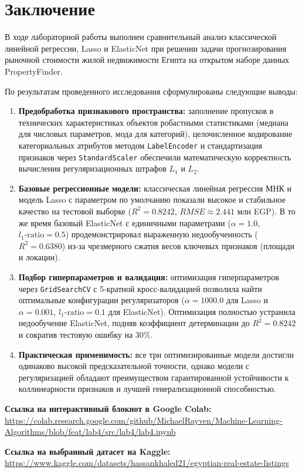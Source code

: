 \chapter*{Заключение}

В ходе лабораторной работы выполнен сравнительный анализ классической линейной регрессии, Lasso и ElasticNet при решении задачи прогнозирования рыночной стоимости жилой недвижимости Египта на открытом наборе данных PropertyFinder.

По результатам проведенного исследования сформулированы следующие выводы:
\begin{enumerate}
    \item \textbf{Предобработка признакового пространства:} заполнение пропусков в технических характеристиках объектов робастными статистиками (медиана для числовых параметров, мода для категорий), целочисленное кодирование категориальных атрибутов методом \texttt{LabelEncoder} и стандартизация признаков через \texttt{StandardScaler} обеспечили математическую корректность вычисления регуляризационных штрафов $L_1$ и $L_2$.
    \item \textbf{Базовые регрессионные модели:} классическая линейная регрессия МНК и модель Lasso с параметром по умолчанию показали высокое и стабильное качество на тестовой выборке ($R^2 = 0.8242$, $RMSE \approx 2.441$ млн EGP). В то же время базовый ElasticNet с единичными параметрами ($\alpha = 1.0$, $l_1\text{-ratio} = 0.5$) продемонстрировал выраженную недообученность ($R^2 = 0.6380$) из-за чрезмерного сжатия весов ключевых признаков (площади и локации).
    \item \textbf{Подбор гиперпараметров и валидация:} оптимизация гиперпараметров через \texttt{GridSearchCV} с 5-кратной кросс-валидацией позволила найти оптимальные конфигурации регуляризаторов ($\alpha = 1000.0$ для Lasso и $\alpha = 0.001$, $l_1\text{-ratio} = 0.1$ для ElasticNet). Оптимизация полностью устранила недообучение ElasticNet, подняв коэффициент детерминации до $R^2 = 0.8242$ и сократив тестовую ошибку на 30\%.
    \item \textbf{Практическая применимость:} все три оптимизированные модели достигли одинаково высокой предсказательной точности, однако модели с регуляризацией обладают преимуществом гарантированной устойчивости к коллинеарности признаков и лучшей генерализационной способностью.
\end{enumerate}

\vspace{16pt}
\noindent \textbf{Ссылка на интерактивный блокнот в Google Colab:} \\
{\footnotesize\url{https://colab.research.google.com/github/MichaelRayven/Machine-Learning-Algorithms/blob/feat/lab4/src/lab4/lab4.ipynb}}

\vspace{10pt}
\noindent \textbf{Ссылка на выбранный датасет на Kaggle:} \\
{\footnotesize\url{https://www.kaggle.com/datasets/hassankhaled21/egyptian-real-estate-listings}}
